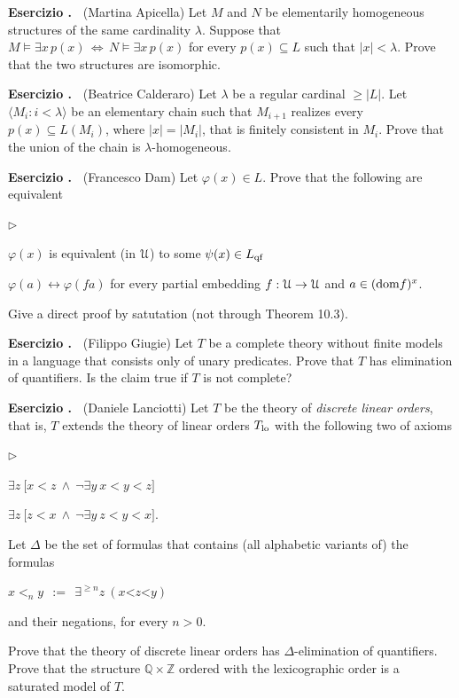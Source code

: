 \documentclass[10pt]{article}
\def\phi{\varphi}
\def\U{\EuScript U}
\def\ZZ{\mathds Z}
\def\QQ{\mathds Q}
\def\<{\langle}
\def\>{\rangle}
\def\E{\exists}
\def\iff{\leftrightarrow}
\def\IFF{\Leftrightarrow}
\def\dom{{\rm dom}}
\newcommand{\labella}[1]{{\sf\footnotesize #1}\hfill}
\renewenvironment{itemize}
  {\begin{list}{$\triangleright$}{%
   \setlength{\parskip}{0mm}
   \setlength{\topsep}{0mm}
   \setlength{\rightmargin}{0mm}
   \setlength{\listparindent}{0mm}
   \setlength{\itemindent}{0mm}
   \setlength{\labelwidth}{3ex}
   \setlength{\itemsep}{0mm}
   \setlength{\parsep}{0mm}
   \setlength{\partopsep}{0mm}
   \setlength{\labelsep}{1ex}
   \setlength{\leftmargin}{\labelwidth+\labelsep}
   \let\makelabel\labella}}{%
   \vspace*{-.3\baselineskip}
  \end{list}}
\newcounter{ex}
\newenvironment{exercise}{\bigskip\addtocounter{ex}{1}\textbf{Esercizio \theex.\ }}{}
\begin{document}
\begin{exercise}
  (Martina Apicella)
  Let $M$ and $N$ be elementarily homogeneous structures of the same cardinality $\lambda$. 
  Suppose that $M\models\E x\, p(x)\,\IFF\,N\models\E x\, p(x)$ for every $p(x)\subseteq L$ such that $|x|<\lambda$.
  Prove that the two structures are isomorphic. 
\end{exercise}

\begin{exercise}
  (Beatrice Calderaro)
  Let $\lambda$ be a regular cardinal $\ge|L|$.
  Let $\<M_i:i<\lambda\>$ be an elementary chain such that $M_{i+1}$ realizes every $p(x)\subseteq L(M_i)$, where $|x|=|M_i|$, that is finitely consistent in $M_i$.
  Prove that the union of the chain is $\lambda$-homogeneous.
\end{exercise}

\begin{exercise}
  (Francesco Dam)
  Let $\phi(x)\in L$.
  Prove that the following are equivalent
  \begin{itemize}
   \item[1.] $\phi(x)$ is equivalent (in $\U$) to some $\psi(x)\in L_{\rm qf}$
   \item[2.] $\phi(a)\iff\phi(fa)$ for every partial embedding $f:\U\to\U$ and $a\in(\dom f)^x$.
  \end{itemize}
  Give a direct proof by satutation (not through Theorem 10.3).
\end{exercise}

\begin{exercise}
  (Filippo Giugie)
  Let $T$ be a complete theory without finite models in a language that consists only of unary predicates. 
  Prove that $T$ has elimination of quantifiers.
  Is the claim true if $T$ is not complete?
\end{exercise}

\begin{exercise}
  (Daniele Lanciotti)
  Let $T$ be the theory of \emph{discrete linear orders}, that is, $T$ extends the theory of linear orders $T_{\rm lo}$ with the following two of axioms
  \begin{itemize}
  \item[dis$\uparrow$.] $\E z\ \big[x<z\ \wedge\ \neg\E y\ x<y<z\big]$
  \item[dis$\downarrow$.] $\E z\ \big[ z<x\ \wedge\ \neg\E y\ z<y<x\big]$.
  \end{itemize}
  Let $\Delta$ be the set of formulas that contains (all alphabetic variants of) the formulas 

  \hfil $x<_ny\ \ :=\ \ \E^{\ge n}z\ (x\mathord<z\mathord< y)$ 

  and their negations, for every $n>0$.

  Prove that the theory of discrete linear orders has $\Delta$-elimination of quantifiers.
  Prove that the structure $\QQ\times\ZZ$ ordered with the lexicographic order is a saturated model of $T$.
\end{exercise}
\end{document}
